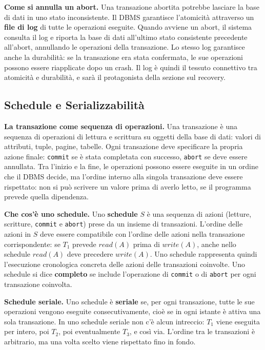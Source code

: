 \documentclass[12pt]{extarticle}
\begin{document}
\medskip
\noindent \textbf{Come si annulla un abort.} Una transazione abortita potrebbe lasciare la base di dati in uno stato inconsistente. Il DBMS garantisce l'atomicità attraverso un \textbf{file di log} di tutte le operazioni eseguite. Quando avviene un abort, il sistema consulta il log e riporta la base di dati all'ultimo stato consistente precedente all'abort, annullando le operazioni della transazione. Lo stesso log garantisce anche la durabilità: se la transazione era stata confermata, le sue operazioni possono essere riapplicate dopo un crash. Il log è quindi il tessuto connettivo tra atomicità e durabilità, e sarà il protagonista della sezione sul recovery.

\subsection{Schedule e Serializzabilità}

\noindent \textbf{La transazione come sequenza di operazioni.} Una transazione è una sequenza di operazioni di lettura e scrittura su oggetti della base di dati: valori di attributi, tuple, pagine, tabelle. Ogni transazione deve specificare la propria azione finale: \texttt{commit} se è stata completata con successo, \texttt{abort} se deve essere annullata. Tra l'inizio e la fine, le operazioni possono essere eseguite in un ordine che il DBMS decide, ma l'ordine interno alla singola transazione deve essere rispettato: non si può scrivere un valore prima di averlo letto, se il programma prevede quella dipendenza.

\medskip
\noindent \textbf{Che cos'è uno schedule.} Uno \textbf{schedule} $S$ è una sequenza di azioni (letture, scritture, \texttt{commit} e \texttt{abort}) prese da un insieme di transazioni. L'ordine delle azioni in $S$ deve essere compatibile con l'ordine delle azioni nella transazione corrispondente: se $T_1$ prevede $read(A)$ prima di $write(A)$, anche nello schedule $read(A)$ deve precedere $write(A)$. Uno schedule rappresenta quindi l'esecuzione cronologica concreta delle azioni delle transazioni coinvolte. Uno schedule si dice \textbf{completo} se include l'operazione di \texttt{commit} o di \texttt{abort} per ogni transazione coinvolta.

\medskip
\noindent \textbf{Schedule seriale.} Uno schedule è \textbf{seriale} se, per ogni transazione, tutte le sue operazioni vengono eseguite consecutivamente, cioè se in ogni istante è attiva una sola transazione. In uno schedule seriale non c'è alcun intreccio: $T_1$ viene eseguita per intero, poi $T_2$, poi eventualmente $T_3$, e così via. L'ordine tra le transazioni è arbitrario, ma una volta scelto viene rispettato fino in fondo.
\end{document}
